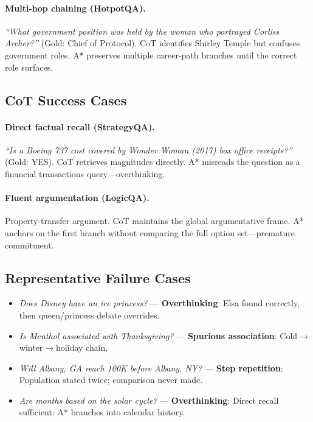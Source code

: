 \documentclass[11pt]{article}
\begin{document}
\paragraph{Multi-hop chaining (HotpotQA).}
\emph{``What government position was held by the woman who portrayed Corliss
Archer?''} (Gold: Chief of Protocol).  CoT identifies Shirley Temple but
confuses government roles.  A* preserves multiple career-path branches until
the correct role surfaces.

\subsection{CoT Success Cases}

\paragraph{Direct factual recall (StrategyQA).}
\emph{``Is a Boeing 737 cost covered by Wonder Woman (2017) box office
receipts?''} (Gold: YES).  CoT retrieves magnitudes directly.  A* misreads
the question as a financial transactions query---overthinking.

\paragraph{Fluent argumentation (LogicQA).}
Property-transfer argument.  CoT maintains the global argumentative frame.
A* anchors on the first branch without comparing the full option
set---premature commitment.

\subsection{Representative Failure Cases}

\begin{itemize}[leftmargin=1.5em,itemsep=2pt]
\item \emph{Does Disney have an ice princess?} --- \textbf{Overthinking}: Elsa found correctly, then queen/princess debate overrides.
\item \emph{Is Menthol associated with Thanksgiving?} --- \textbf{Spurious association}: Cold$\rightarrow$winter$\rightarrow$holiday chain.
\item \emph{Will Albany, GA reach 100K before Albany, NY?} --- \textbf{Step repetition}: Population stated twice; comparison never made.
\item \emph{Are months based on the solar cycle?} --- \textbf{Overthinking}: Direct recall sufficient; A* branches into calendar history.
\end{itemize}
\end{document}
